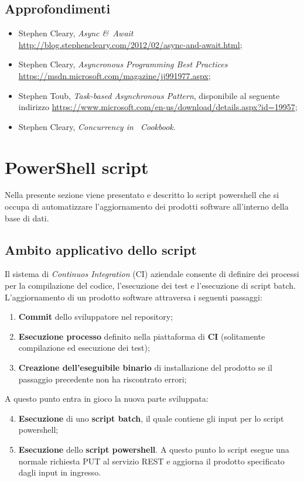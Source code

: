 \documentclass[../RelazioneFinale.tex]{subfiles}
\begin{document}
			\subsection{Approfondimenti}
			\begin{itemize}
				\item Stephen Cleary, \emph{Async \&\ Await} \url{http://blog.stephencleary.com/2012/02/async-and-await.html};
				\item Stephen Cleary, \emph{Asyncronous Programming Best Practices} \url{https://msdn.microsoft.com/magazine/jj991977.aspx};
				\item Stephen Toub, \emph{Task-based Asynchronous Pattern}, disponibile al seguente indirizzo \url{https://www.microsoft.com/en-us/download/details.aspx?id=19957};
				
				\item Stephen Cleary, \emph{Concurrency in \Csharp\ Cookbook}.
			\end{itemize}


\newpage %

	\section{PowerShell script}
	\label{sec:PSscript}
		Nella presente sezione viene presentato e descritto lo script powershell che si occupa di automatizzare l'aggiornamento dei prodotti software all'interno della base di dati.
		
		\subsection{Ambito applicativo dello script}
			Il sistema di \emph{Continuos Integration} (CI) aziendale consente di definire dei processi per la compilazione del codice, l'esecuzione dei test e l'esecuzione di script batch.
			L'aggiornamento di un prodotto software attraversa i seguenti passaggi:
			\begin{enumerate}
				\item \textbf{Commit} dello sviluppatore nel repository;
				\item \textbf{Esecuzione processo} definito nella piattaforma di \textbf{CI} (solitamente compilazione ed esecuzione dei test);
				\item \textbf{Creazione dell'eseguibile binario} di installazione del prodotto se il passaggio precedente non ha riscontrato errori;
			\end{enumerate}
			A questo punto entra in gioco la nuova parte sviluppata:
			\begin{enumerate}
				\setcounter{enumi}{3}
				\item \textbf{Esecuzione} di uno \textbf{script batch}, il quale contiene gli input per lo script powershell;
				\item \textbf{Esecuzione} dello \textbf{script powershell}. A questo punto lo script esegue una normale richiesta PUT al servizio REST e aggiorna il prodotto specificato dagli input in ingresso.
			\end{enumerate}
		
\end{document}
